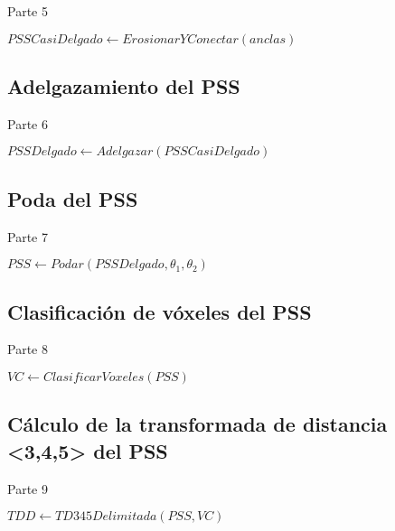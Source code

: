 \begin{algorithm}[H]
\caption{Parte 5}
\begin{algorithmic}[1]
\State $PSSCasiDelgado \gets ErosionarYConectar(anclas)$
\end{algorithmic}
\end{algorithm}

\subsection{Adelgazamiento del PSS}

\begin{algorithm}[H]
\caption{Parte 6}
\begin{algorithmic}[1]
\State $PSSDelgado \gets Adelgazar(PSSCasiDelgado)$
\end{algorithmic}
\end{algorithm}

\subsection{Poda del PSS} \label{ssec:prune1}

\begin{algorithm}[H]
\caption{Parte 7}
\begin{algorithmic}[1]
\State $PSS \gets Podar(PSSDelgado, \theta_1, \theta_2)$ \label{ddprune1}
\end{algorithmic}
\end{algorithm}

\subsection{Clasificación de vóxeles del PSS}

\begin{algorithm}[H]
\caption{Parte 8}
\begin{algorithmic}[1]
\State $VC \gets ClasificarVoxeles(PSS)$
\end{algorithmic}
\end{algorithm}

\subsection{Cálculo de la transformada de distancia <3,4,5> del PSS}

\begin{algorithm}[H]
\caption{Parte 9}
\begin{algorithmic}[1]
\State $TDD \gets TD345Delimitada(PSS, VC)$
\end{algorithmic}
\end{algorithm}


